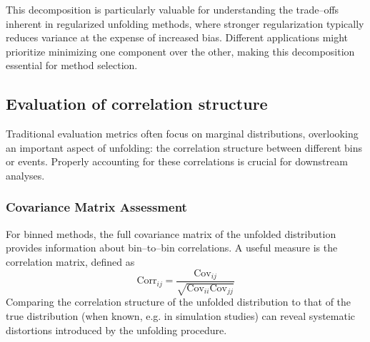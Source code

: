         This decomposition is particularly valuable for understanding the trade--offs inherent in regularized unfolding methods, where stronger regularization typically reduces variance at the expense of increased bias.
        Different applications might prioritize minimizing one component over the other, making this decomposition essential for method selection.

    \subsection{Evaluation of correlation structure}
        Traditional evaluation metrics often focus on marginal distributions, overlooking an important aspect of unfolding: the correlation structure between different bins or events.
        Properly accounting for these correlations is crucial for downstream analyses.
        \subsubsection{Covariance Matrix Assessment}
            For binned methods, the full covariance matrix of the unfolded distribution provides information about bin--to--bin correlations.
            A useful measure is the correlation matrix, defined as
            \begin{equation}
                \text{Corr}_{ij} = \frac{\text{Cov}_{ij}}{\sqrt{\text{Cov}_{ii}\text{Cov}_{jj}}}
            \end{equation}
            Comparing the correlation structure of the unfolded distribution to that of the true distribution (when known, e.g. in simulation studies) can reveal systematic distortions introduced by the unfolding procedure.
